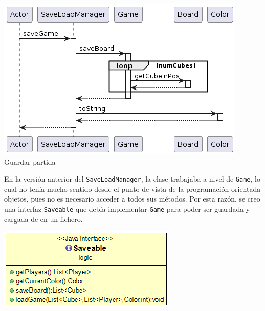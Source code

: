 \documentclass[../DocumentoOficial.tex]{subfiles}
\begin{document}
\begin{sprint}[1]
\begin{center}
\centering
\includegraphics[scale=0.5]{save-game-sprint1.png}\\
\footnotesize{Guardar partida}
\end{center}
\end{sprint}

\begin{sprint}[2]
En la versión anterior del \texttt{SaveLoadManager}, la clase trabajaba a nivel de \texttt{Game}, lo cual no tenía mucho sentido desde el punto de vista de la programación orientada objetos, pues no es necesario acceder a todos sus métodos. Por esta razón, se creo una interfaz \texttt{Saveable} que debía implementar \texttt{Game} para poder ser guardada y cargada de en un fichero.

\begin{center}
\centering
\includegraphics[scale=0.5]{saveable-sprint2.png}
\end{center}

\end{sprint}
\end{document}

